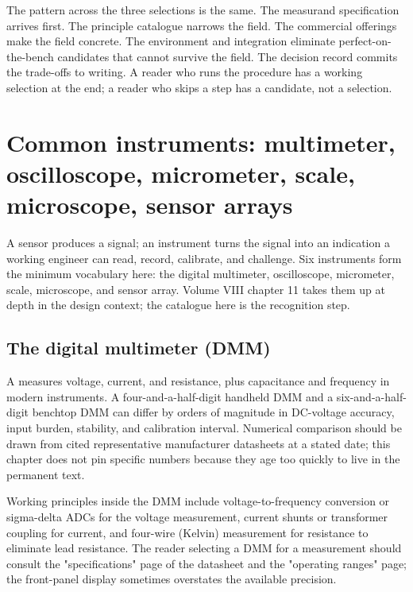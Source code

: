 The pattern across the three selections is the same. The
measurand specification arrives first. The principle catalogue
narrows the field. The commercial offerings make the field
concrete. The environment and integration eliminate
perfect-on-the-bench candidates that cannot survive the field. The
decision record commits the trade-offs to writing. A reader who
runs the procedure has a working selection at the end; a reader who
skips a step has a candidate, not a selection.

\section{Common instruments: multimeter, oscilloscope, micrometer,
scale, microscope, sensor arrays}

A sensor produces a signal; an instrument turns the signal into an
indication a working engineer can read, record, calibrate, and
challenge. Six instruments form the minimum vocabulary here: the
digital multimeter, oscilloscope, micrometer, scale, microscope,
and sensor array. Volume VIII chapter 11 takes them up at depth in
the design context; the catalogue here is the recognition step.

\subsection{The digital multimeter (DMM)}

A  measures voltage, current, and resistance,
plus capacitance and frequency in modern instruments. A
four-and-a-half-digit handheld DMM and a six-and-a-half-digit
benchtop DMM can differ by orders of magnitude in DC-voltage
accuracy, input burden, stability, and calibration interval.
Numerical comparison should be drawn from cited representative
manufacturer datasheets at a stated date; this chapter does not pin
specific numbers because they age too quickly to live in the
permanent text.

Working principles inside the DMM include voltage-to-frequency
conversion or sigma-delta ADCs for the voltage measurement, current
shunts or transformer coupling for current, and four-wire
(Kelvin) measurement for resistance to eliminate lead resistance.
The reader selecting a DMM for a measurement should consult the
"specifications" page of the datasheet and the "operating ranges"
page; the front-panel display sometimes overstates the available
precision.

